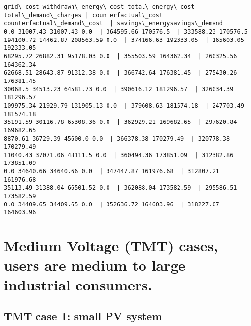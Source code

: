 \documentclass[11pt]{article}
\begin{document}
    \begin{Verbatim}[commandchars=\\\{\}]
grid\_cost withdrawn\_energy\_cost total\_energy\_cost total\_demand\_charges | counterfactual\_cost counterfactual\_demand\_cost  | savings\_energysavings\_demand
0.0 31007.43 31007.43 0.0  | 364595.66 170576.5  | 333588.23 170576.5
194100.72 14462.87 208563.59 0.0  | 374166.63 192333.05  | 165603.05 192333.05
68295.72 26882.31 95178.03 0.0  | 355503.59 164362.34  | 260325.56 164362.34
62668.51 28643.87 91312.38 0.0  | 366742.64 176381.45  | 275430.26 176381.45
30068.5 34513.23 64581.73 0.0  | 390616.12 181296.57  | 326034.39 181296.57
109975.34 21929.79 131905.13 0.0  | 379608.63 181574.18  | 247703.49 181574.18
35191.59 30116.78 65308.36 0.0  | 362929.21 169682.65  | 297620.84 169682.65
8870.61 36729.39 45600.0 0.0  | 366378.38 170279.49  | 320778.38 170279.49
11040.43 37071.06 48111.5 0.0  | 360494.36 173851.09  | 312382.86 173851.09
0.0 34640.66 34640.66 0.0  | 347447.87 161976.68  | 312807.21 161976.68
35113.49 31388.04 66501.52 0.0  | 362088.04 173582.59  | 295586.51 173582.59
0.0 34409.65 34409.65 0.0  | 352636.72 164603.96  | 318227.07 164603.96

    \end{Verbatim}

    \hypertarget{medium-voltage-tmt-cases-users-are-medium-to-large-industrial-consumers.}{%
\section{Medium Voltage (TMT) cases, users are medium to large
industrial
consumers.}\label{medium-voltage-tmt-cases-users-are-medium-to-large-industrial-consumers.}}

    \hypertarget{tmt-case-1-small-pv-system}{%
\subsection{TMT case 1: small PV
system}\label{tmt-case-1-small-pv-system}}
\end{document}
